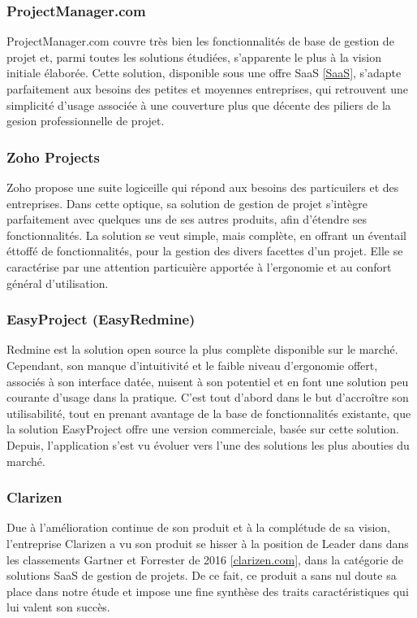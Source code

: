 \begin{spacing}{1.5}
\subsubsection*{ProjectManager.com} %
ProjectManager.com couvre très bien les fonctionnalités de base de gestion de projet et, parmi toutes les solutions étudiées, s'apparente le plus à la vision initiale élaborée. Cette solution, disponible sous une offre SaaS \ref{SaaS}, s'adapte parfaitement aux besoins des petites et moyennes entreprises, qui retrouvent une simplicité d'usage associée à une couverture plus que décente des piliers de la gesion professionnelle de projet.

\subsubsection*{Zoho Projects} %
Zoho propose une suite logiceille qui répond aux besoins des particuilers et des entreprises. Dans cette optique, sa solution de gestion de projet s'intègre parfaitement avec quelques uns de ses autres produits, afin d'étendre ses fonctionnalités. La solution se veut simple, mais complète, en offrant un éventail éttoffé de fonctionnalités, pour la gestion des divers facettes d'un projet. Elle se caractérise par une attention particuière apportée à l'ergonomie et au confort général d'utilisation.

\subsubsection*{EasyProject (EasyRedmine)} %
Redmine est la solution open source la plus complète disponible sur le marché. Cependant, son manque d'intuitivité et le faible niveau d'ergonomie offert, associés à son interface datée, nuisent à son potentiel et en font une solution peu courante d'usage dans la pratique. C'est tout d'abord dans le but d'accroître son utilisabilité, tout en prenant avantage de la base de fonctionnalités existante, que la solution EasyProject offre une version commerciale, basée sur cette solution. Depuis, l'application s'est vu évoluer vers l'une des solutions les plus abouties du marché.

\subsubsection*{Clarizen} %
Due à l'amélioration continue de son produit et à la complétude de sa vision, l'entreprise Clarizen a vu son produit se hisser à la position de Leader dans dans les classements Gartner et Forrester de 2016 \ref{clarizen.com}, dans la catégorie de solutions SaaS de gestion de projets. De ce fait, ce produit a sans nul doute sa place dans notre étude et impose une fine synthèse des traits caractéristiques qui lui valent son succès.
\\


\end{spacing}
